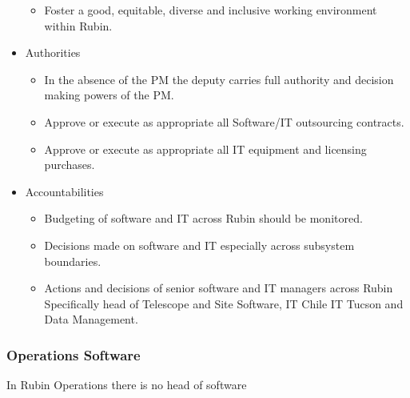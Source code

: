 \begin{itemize}
\begin{itemize}
\item Foster a good, equitable, diverse and inclusive working environment within Rubin.
\end{itemize}
\item Authorities
\begin{itemize}
\item  In the absence of the PM the deputy carries full authority and decision making powers
of the PM.
\item Approve or execute as appropriate all Software/IT outsourcing contracts.
\item Approve or execute as appropriate all IT equipment and licensing purchases.
\end{itemize}
\item Accountabilities
\begin{itemize}
\item Budgeting of software and IT across Rubin should be monitored.
\item Decisions made on software and IT especially across subsystem boundaries.
\item Actions and decisions of senior software and IT managers across Rubin Specifically head of Telescope and Site Software, IT Chile IT Tucson and Data Management.

\end{itemize}
\end{itemize}


\subsubsection{Operations Software} \label{sec:opssw}

In Rubin Operations there is no head of software


